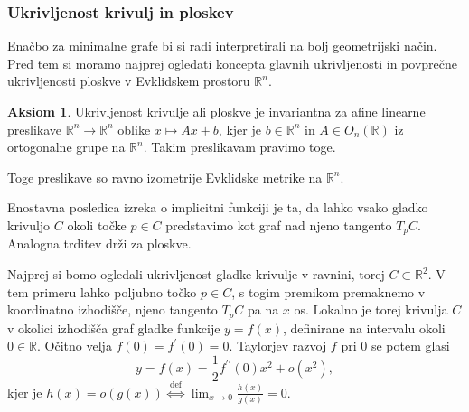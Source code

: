 \documentclass[8pt]{beamer}
\theoremstyle{definition}
\newtheorem{aksiom}{Aksiom}
\theoremstyle{remark}
\theoremstyle{plain}
\numberwithin{equation}{section}  %
\begin{document}
\begin{frame}
    \frametitle{Ukrivljenost krivulj in ploskev}

    Enačbo za minimalne grafe bi si radi interpretirali na bolj geometrijski način. Pred tem si moramo najprej ogledati koncepta glavnih ukrivljenosti in povprečne ukrivljenosti ploskve v Evklidskem prostoru $\mathbb{R}^n$.

    \begin{aksiom}
        Ukrivljenost krivulje ali ploskve je invariantna za afine linearne preslikave $\mathbb{R}^n \rightarrow \mathbb{R}^n$ oblike $x \mapsto A x+b$, kjer je $b \in \mathbb{R}^n$ in $A \in O_n(\mathbb{R})$ iz ortogonalne grupe na $\mathbb{R}^n$. Takim preslikavam pravimo \textcolor{red1}{toge}.
    \end{aksiom}
    Toge preslikave so ravno izometrije Evklidske metrike na $\mathbb{R}^n$. 

    \vspace{0.8em}

    Enostavna posledica izreka o implicitni funkciji je ta, da lahko vsako gladko krivuljo $C$ okoli točke $p \in C$ predstavimo kot graf nad njeno tangento $T_p C$. Analogna trditev drži za ploskve. 
    
    \vspace{0.8em}

    Najprej si bomo ogledali ukrivljenost gladke krivulje v ravnini, torej $C \subset \mathbb{R}^2$. V tem primeru lahko poljubno točko $p \in C$, s togim premikom premaknemo v koordinatno izhodišče, njeno tangento $T_p C$ pa na $x$ os. Lokalno je torej krivulja $C$ v okolici izhodišča graf gladke funkcije $y=f(x)$, definirane na intervalu okoli $0 \in \mathbb{R}$. Očitno velja $f(0)=f^{\prime}(0)=0$. Taylorjev razvoj $f$ pri $0$ se potem glasi
    \begin{equation*}
        y=f(x)=\frac{1}{2} f^{\prime \prime}(0) x^2+o\left(x^2\right),
    \end{equation*}
    kjer je $h(x)=o\left(g(x)\right) \stackrel{\text { def }}{\iff} \lim _{x \rightarrow 0} \frac{h(x)}{g(x)}=0$.

\end{frame}
\end{document}
